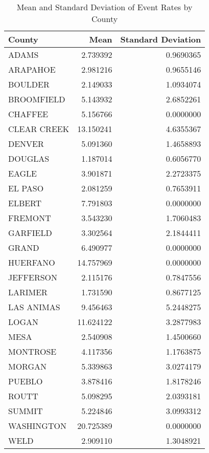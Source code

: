 \documentclass[
]{article}
\begin{document}
\FloatBarrier
\begin{table}[!h]

\caption{\label{tab:unnamed-chunk-14}Mean and Standard Deviation of Event Rates by County}
\centering
\begin{tabular}[t]{l|r|r}
\hline
County & Mean & Standard Deviation\\
\hline
ADAMS & 2.739392 & 0.9690365\\
\hline
ARAPAHOE & 2.981216 & 0.9655146\\
\hline
BOULDER & 2.149033 & 1.0934074\\
\hline
BROOMFIELD & 5.143932 & 2.6852261\\
\hline
CHAFFEE & 5.156766 & 0.0000000\\
\hline
CLEAR CREEK & 13.150241 & 4.6355367\\
\hline
DENVER & 5.091360 & 1.4658893\\
\hline
DOUGLAS & 1.187014 & 0.6056770\\
\hline
EAGLE & 3.901871 & 2.2723375\\
\hline
EL PASO & 2.081259 & 0.7653911\\
\hline
ELBERT & 7.791803 & 0.0000000\\
\hline
FREMONT & 3.543230 & 1.7060483\\
\hline
GARFIELD & 3.302564 & 2.1844411\\
\hline
GRAND & 6.490977 & 0.0000000\\
\hline
HUERFANO & 14.757969 & 0.0000000\\
\hline
JEFFERSON & 2.115176 & 0.7847556\\
\hline
LARIMER & 1.731590 & 0.8677125\\
\hline
LAS ANIMAS & 9.456463 & 5.2448275\\
\hline
LOGAN & 11.624122 & 3.2877983\\
\hline
MESA & 2.540908 & 1.4500660\\
\hline
MONTROSE & 4.117356 & 1.1763875\\
\hline
MORGAN & 5.339863 & 3.0274179\\
\hline
PUEBLO & 3.878416 & 1.8178246\\
\hline
ROUTT & 5.098295 & 2.0393181\\
\hline
SUMMIT & 5.224846 & 3.0993312\\
\hline
WASHINGTON & 20.725389 & 0.0000000\\
\hline
WELD & 2.909110 & 1.3048921\\
\hline
\end{tabular}
\end{table}
\FloatBarrier
\end{document}
